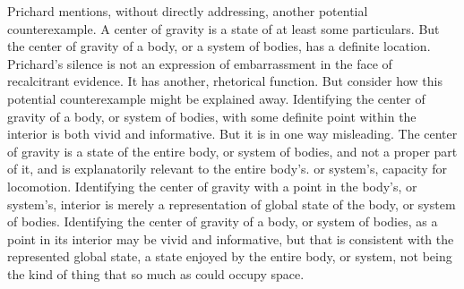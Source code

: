 Prichard mentions, without directly addressing, another potential counterexample. A center of gravity is a state of at least some particulars. But the center of gravity of a body, or a system of bodies, has a definite location. Prichard's silence is not an expression of embarrassment in the face of recalcitrant evidence. It has another, rhetorical function. But consider how this potential counterexample might be explained away. Identifying the center of gravity of a body, or system of bodies, with some definite point within the interior is both vivid and informative. But it is in one way misleading. The center of gravity is a state of the entire body, or system of bodies, and not a proper part of it, and is explanatorily relevant to the entire body's. or system's, capacity for locomotion. Identifying the center of gravity with a point in the body's, or system's, interior is merely a representation of global state of the body, or system of bodies. Identifying the center of gravity of a body, or system of bodies, as a point in its interior may be vivid and informative, but that is consistent with the represented global state, a state enjoyed by the entire body, or system, not being the kind of thing that so much as could occupy space.

